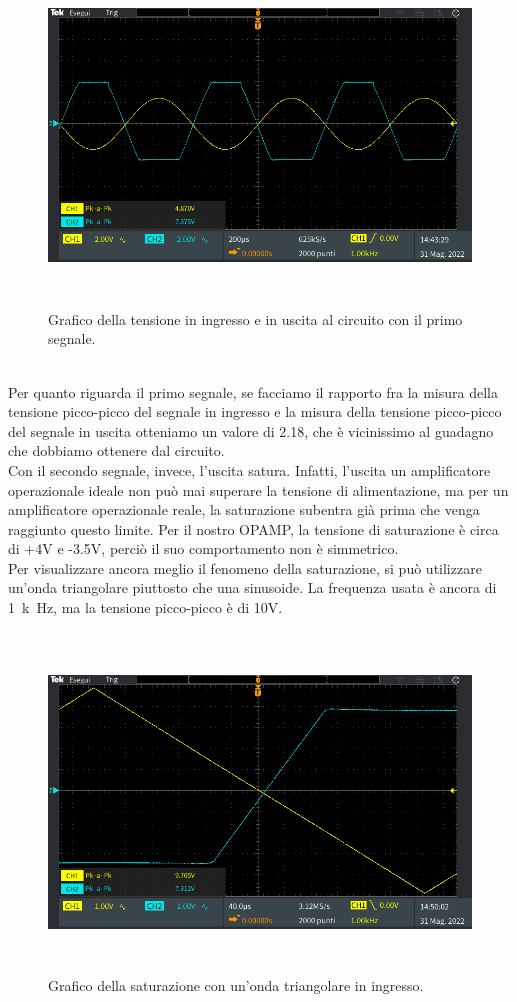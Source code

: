 \documentclass{report}
\begin{document}
\begin{figure}[h]
\centering
\includegraphics[height=9cm]{immagini/oscillo13}
\caption{Grafico della tensione in ingresso e in uscita al circuito con il primo segnale.}
\label{figura:oscillo13}
\end{figure}
\\Per quanto riguarda il primo segnale, se facciamo il rapporto fra la misura della tensione picco-picco del segnale in ingresso e la misura della tensione picco-picco del segnale in uscita otteniamo un valore di 2.18, che è vicinissimo al guadagno che dobbiamo ottenere dal circuito.
\\\indent Con il secondo segnale, invece, l'uscita satura. Infatti, l'uscita un amplificatore operazionale ideale non può mai superare la tensione di alimentazione, ma per un amplificatore operazionale reale, la saturazione subentra già prima che venga raggiunto questo limite. Per il nostro OPAMP, la tensione di saturazione è circa di +4V e -3.5V, perciò il suo comportamento non è simmetrico.
\\Per visualizzare ancora meglio il fenomeno della saturazione, si può utilizzare un'onda triangolare piuttosto che una sinusoide. La frequenza usata è ancora di \SI{1}{k\hertz}, ma la tensione picco-picco è di 10V.
\begin{figure}[h!]
\centering
\includegraphics[height=9cm]{immagini/oscillo14}
\caption{Grafico della saturazione con un'onda triangolare in ingresso.}
\label{figura:oscillo14}
\end{figure}
\end{document}
